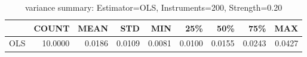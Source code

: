 \begin{table}[ht]
\centering
\caption{variance summary: Estimator=OLS, Instruments=200, Strength=0.20}
\begin{tabular}{lrrrrrrrr}
\toprule
 & COUNT & MEAN & STD & MIN & 25\% & 50\% & 75\% & MAX \\
\midrule
OLS & 10.0000 & 0.0186 & 0.0109 & 0.0081 & 0.0100 & 0.0155 & 0.0243 & 0.0427 \\
\bottomrule
\end{tabular}
\end{table}
